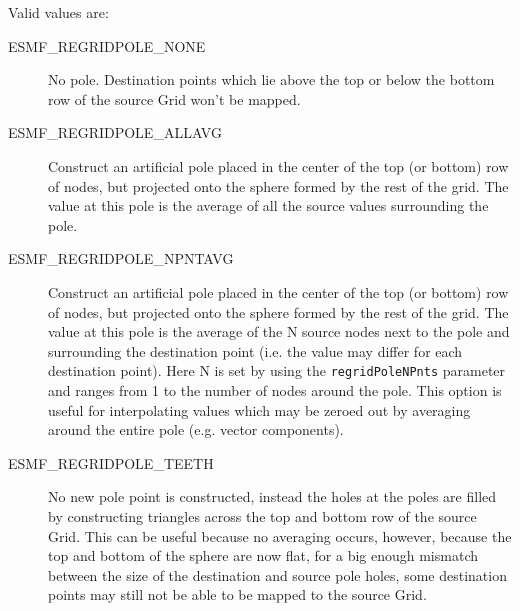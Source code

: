 Valid values are:
\begin{description}
\item [ESMF\_REGRIDPOLE\_NONE]
      No pole. Destination points which lie above the top or below the bottom row of the source Grid won't be mapped. 
\item [ESMF\_REGRIDPOLE\_ALLAVG]
      Construct an artificial pole placed in the center of the top (or bottom) row of nodes, but projected onto the sphere formed by the rest of the grid. The value at this pole is the average of all the source values surrounding the pole.
\item [ESMF\_REGRIDPOLE\_NPNTAVG] Construct an artificial pole placed in the center of the top (or bottom) row of nodes, but projected onto the sphere formed by the rest of the grid. The value at this pole is the average of the N source nodes next to the pole and surrounding the destination point (i.e. the value may differ for each destination point). Here N is set by using the {\tt regridPoleNPnts} parameter and ranges from 1 to the number of nodes around the pole. This option is useful for interpolating values which may be zeroed out by averaging around the entire pole (e.g. vector components). 

\item [ESMF\_REGRIDPOLE\_TEETH]
    No new pole point is constructed, instead the holes at the poles are filled by constructing triangles across the top and bottom row of the source Grid. This can be useful because no averaging occurs, however, because the top and bottom of the sphere are now flat, for a big enough mismatch between the size of the destination and source pole holes, some destination points may still not be able to be mapped to the source Grid. 

\end{description}


